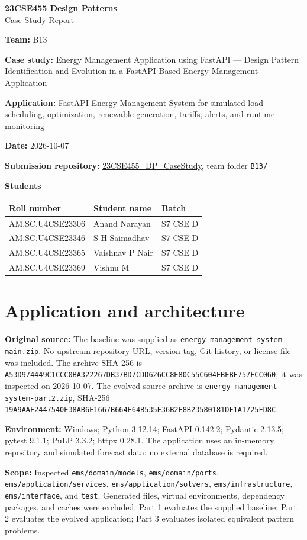 \documentclass[11pt,a4paper]{article}
\newcommand{\entry}[2]{\textbf{#1:} #2\par}
\newcommand{\codepath}[1]{\nolinkurl{#1}}
\begin{document}
\begin{center}
\Large\textbf{23CSE455 Design Patterns}\\[4pt]
\LARGE Case Study Report
\end{center}

\entry{Team}{B13}
\entry{Case study}{Energy Management Application using FastAPI --- Design Pattern Identification and Evolution in a FastAPI-Based Energy Management Application}
\entry{Application}{FastAPI Energy Management System for simulated load scheduling, optimization, renewable generation, tariffs, alerts, and runtime monitoring}
\entry{Date}{2026-10-07}
\textbf{Submission repository:} \href{https://github.com/aswathymohan-amrita/23CSE455_DP_CaseStudy}{23CSE455\_DP\_CaseStudy}, team folder \codepath{B13/}\par

\textbf{Students}\par
\begin{tabularx}{\linewidth}{@{}llX@{}}
\toprule
Roll number & Student name & Batch\\
\midrule
AM.SC.U4CSE23306 & Anand Narayan & S7 CSE D\\
AM.SC.U4CSE23346 & S H Saimadhav & S7 CSE D\\
AM.SC.U4CSE23365 & Vaishnav P Nair & S7 CSE D\\
AM.SC.U4CSE23369 & Vishnu M & S7 CSE D\\
\bottomrule
\end{tabularx}

\section{Application and architecture}

\entry{Original source}{The baseline was supplied as \codepath{energy-management-system-main.zip}. No upstream repository URL, version tag, Git history, or license file was included. The archive SHA-256 is \codepath{A53D974449C1CCC0BA322267DB37BD7CDD626CC8E80C55C604EBEBF757FCC060}; it was inspected on 2026-10-07. The evolved source archive is \codepath{energy-management-system-part2.zip}, SHA-256 \codepath{19A9AAF2447540E38AB6E1667B664E64B535E36B2E8B23580181DF1A1725FD8C}.}

\entry{Environment}{Windows; Python 3.12.14; FastAPI 0.142.2; Pydantic 2.13.5; pytest 9.1.1; PuLP 3.3.2; httpx 0.28.1. The application uses an in-memory repository and simulated forecast data; no external database is required.}

\entry{Scope}{Inspected \codepath{ems/domain/models}, \codepath{ems/domain/ports}, \codepath{ems/application/services}, \codepath{ems/application/solvers}, \codepath{ems/infrastructure}, \codepath{ems/interface}, and \codepath{test}. Generated files, virtual environments, dependency packages, and caches were excluded. Part 1 evaluates the supplied baseline; Part 2 evaluates the evolved application; Part 3 evaluates isolated equivalent pattern problems.}
\end{document}
